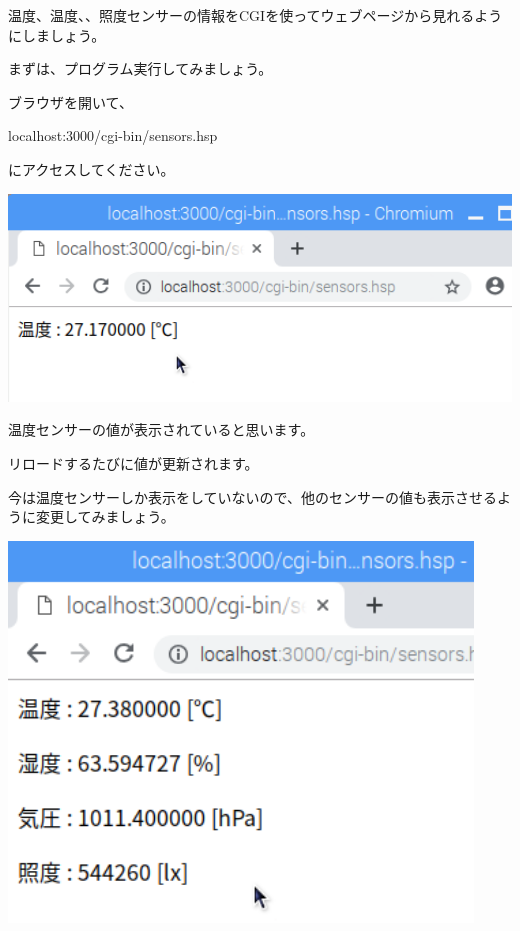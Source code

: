 \documentclass[a4paper,12pt,dvipdfmx]{jarticle}
\begin{document}
温度、温度、、照度センサーの情報をCGIを使ってウェブページから見れるようにしましょう。


\bigskip

まずは、プログラム実行してみましょう。

ブラウザを開いて、

localhost:3000/cgi-bin/sensors.hsp

にアクセスしてください。


%


\centering
\includegraphics[width=17.0cm]{ome7-img058.png}
\flushleft


\bigskip

温度センサーの値が表示されていると思います。

リロードするたびに値が更新されます。

今は温度センサーしか表示をしていないので、他のセンサーの値も表示させるように変更してみましょう。

%


\centering
\includegraphics[width=12.34cm]{ome7-img059.png}
\flushleft
\end{document}
